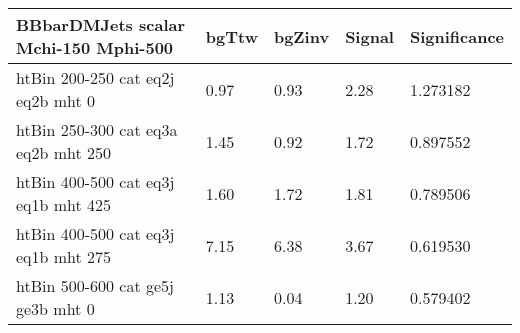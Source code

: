  \begin{tabular}{|l|l|l|l|l|}
\small
   \label{mostSensitiveBins_BBbarDMJets_scalar_Mchi-150_Mphi-500_25ns}
	\textbf{BBbarDMJets scalar Mchi-150 Mphi-500}	 & 	bgTtw	 & 	bgZinv	 & 	Signal &	 Significance \\ 
	\hline
	htBin 200-250 cat eq2j eq2b mht 0 & 	0.97	 & 	0.93	 & 	2.28 	&1.273182 \\ 
	htBin 250-300 cat eq3a eq2b mht 250 & 	1.45	 & 	0.92	 & 	1.72 	&0.897552 \\ 
	htBin 400-500 cat eq3j eq1b mht 425 & 	1.60	 & 	1.72	 & 	1.81 	&0.789506 \\ 
	htBin 400-500 cat eq3j eq1b mht 275 & 	7.15	 & 	6.38	 & 	3.67 	&0.619530 \\ 
	htBin 500-600 cat ge5j ge3b mht 0 & 	1.13	 & 	0.04	 & 	1.20 	&0.579402 \\ 
\end{tabular}

